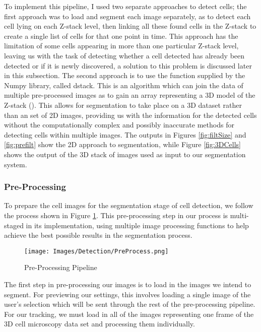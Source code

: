 \documentclass[12pt a4paper]{article}
\begin{document}
To implement this pipeline, I used two separate approaches to detect cells; the first approach was to load and segment each image separately, as to detect each cell lying on each Z-stack level, then linking all these found cells in the Z-stack to create a single list of cells for that one point in time. This approach has the limitation of some cells appearing in more than one particular Z-stack level, leaving us with the task of detecting whether a cell detected has already been detected or if it is newly discovered, a solution to this problem is discussed later in this subsection. 
The second approach is to use the function supplied by the Numpy library, called dstack. This is an algorithm which can join the data of multiple pre-processed images as to gain an array representing a 3D model of the Z-stack (\cite{oliphant2006guide}). This allows for segmentation to take place on a 3D dataset rather than an set of 2D images, providing us with the information for the detected cells without the computationally complex and possibly inaccurate methods for detecting cells within multiple images. The outputs in Figures \ref{fig:filtSize} and \ref{fig:prefilt} show the 2D approach to segmentation, while Figure \ref{fig:3DCells} shows the output of the 3D stack of images used as input to our segmentation system.

\subsubsection{Pre-Processing}
To prepare the cell images for the segmentation stage of cell detection, we follow the process shown in Figure \ref{fig:prePro}. This pre-processing step in our process is multi-staged in its implementation, using multiple image processing functions to help achieve the best possible results in the segmentation process.

\begin{figure}
    \centering
    \texttt{[image: Images/Detection/PreProcess.png]}
    \caption{Pre-Processing Pipeline}
    \label{fig:prePro}
\end{figure}

The first step in pre-processing our images is to load in the images we intend to segment. For previewing our settings, this involves loading a single image of the user's selection which will be sent through the rest of the pre-processing pipeline. For our tracking, we must load in all of the images representing one frame of the 3D cell microscopy data set and processing them individually.
\end{document}
